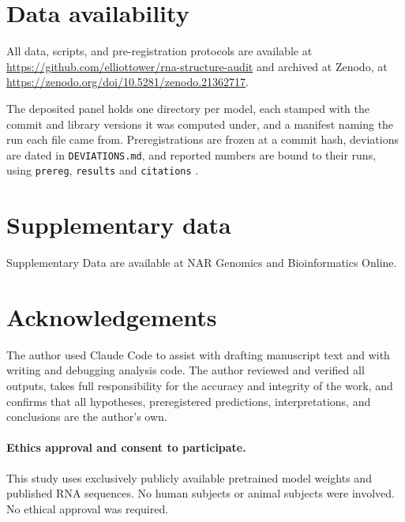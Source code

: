 \documentclass[11pt]{article}
\begin{document}
\section*{Data availability}

{\sloppy All data, scripts, and pre-registration protocols are available at
\url{https://github.com/elliottower/rna-structure-audit} and archived at
Zenodo, at \url{https://zenodo.org/doi/10.5281/zenodo.21362717}.\par}

The deposited panel holds one directory per model, each stamped with the commit
and library versions it was computed under, and a manifest naming the run each
file came from. Preregistrations are frozen at a commit hash, deviations are
dated in \texttt{DEVIATIONS.md}, and reported numbers are bound to their runs,
using \texttt{prereg}, \texttt{results} and \texttt{citations}
\citep{tower2026reproducible}.


\section*{Supplementary data}

Supplementary Data are available at NAR Genomics and Bioinformatics Online.


\section*{Acknowledgements}

The author used Claude Code \citep{anthropic2025claude} to assist with
drafting manuscript text and with writing and debugging analysis code.
The author reviewed and verified all outputs, takes full responsibility
for the accuracy and integrity of the work, and confirms that all
hypotheses, preregistered predictions, interpretations, and conclusions
are the author's own.

\paragraph{Ethics approval and consent to participate.}
This study uses exclusively publicly available pretrained model weights
and published RNA sequences. No human subjects or animal subjects were
involved. No ethical approval was required.
\end{document}
